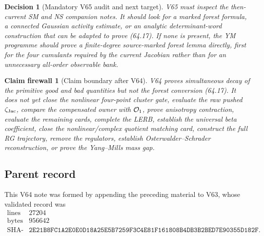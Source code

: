 \documentclass[11pt,oneside]{book}
\newtheorem{firewall}[theorem]{Claim firewall}
\newtheorem{decision}[theorem]{Decision}
\theoremstyle{definition}
\theoremstyle{remark}
\begin{document}
\begin{decision}[Mandatory V65 audit and next target]
\label{dec:e8v64-next}
V65 must inspect the then-current SM and NS companion notes.  It
should look for a marked forest formula, a connected Gaussian
activity estimate, or an analytic determinant-word construction
that can be adapted to prove (64.17).  If none is present, the YM
programme should prove a finite-degree source-marked forest lemma
directly, first for the four cumulants required by the current
Jacobian rather than for an unnecessary all-order observable bank.
\end{decision}

\begin{firewall}[Claim boundary after V64]
\label{fire:e8v64-claim}
V64 proves simultaneous decay of the primitive good and bad
quantities but not the forest conversion (64.17).  It does not yet
close the nonlinear four-point cluster gate, evaluate the raw pushed
\(\zeta_{\rm Jac}\), compare the compensated owner with
\({\cal O}_1\), prove anisotropy contraction, evaluate the remaining
cards, complete the LERB, establish the universal beta coefficient,
close the nonlinear/complex quotient matching card, construct the
full RG trajectory, remove the regulators, establish
Osterwalder--Schrader reconstruction, or prove the Yang--Mills mass
gap.
\end{firewall}

\subsection{Parent record}

This V64 note was formed by appending the preceding material to V63,
whose validated record was
\[
\begin{array}{c|c}
\text{lines}&27204\\
\text{bytes}&956642\\
\text{SHA-256}&
\texttt{2E21B8FC1A2E0E0D18A25E5B7259F3C4E81F161808B4DB3B2BED7E90355D182F}.
\end{array}
\]


\end{document}
